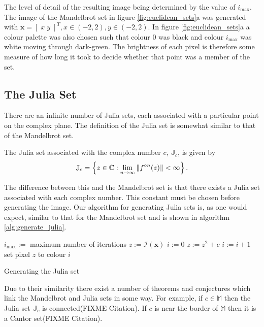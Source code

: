 The level of detail of the resulting image being determined by the value of $i_{\mbox{max}}$.
The image of the Mandelbrot set in figure \ref{fig:euclidean_sets}a was
generated with $\mathbf{x} = [\;x\;y\;]^T, x \in (-2,2), y \in (-2,2)$.
In figure \ref{fig:euclidean_sets}a a colour palette was also chosen such that colour 0 was black
and colour $i_{\mbox{max}}$ was white moving through dark-green. The brightness of
each pixel is therefore some measure of how long it took to decide whether that point was
a member of the set.

\subsection{The Julia Set}

There are an infinite number of Julia sets, each associated with
a particular point on the complex plane. The definition of the Julia set is somewhat
similar to that of the Mandelbrot set.

\begin{definition}
The Julia set associated
with the complex number $c$, $\mathbb{J}_c$, is given by
\[
\mathbb{J}_c = 
\left\{z \in \mathbb{C}
: \lim_{n \rightarrow \infty} \left\Vert f^{\circ n}(z) \right\Vert < \infty \right\}.
\]
\end{definition}

The difference between this and the Mandelbrot set is that there exists a 
Julia set associated with each complex number. This constant must be chosen before
generating the image. Our algorithm for generating Julia sets is, as one would
expect, similar to that for the Mandelbrot set and is shown in algorithm
\ref{alg:generate_julia}.

\begin{fancyalg}
\begin{algorithmic}[1]
\STATE $i_{\mbox{max}} :=$ maximum number of iterations
\STATE $z := {\mathcal I}(\mathbf{x})$
\STATE $i := 0$
  \STATE $z := z^2 + c$
  \STATE $i := i+1$
\ENDWHILE 
\STATE set pixel $z$ to colour $i$
\ENDFOR
\end{algorithmic}
\caption{
\label{alg:generate_julia}
  Generating the Julia set}
\end{fancyalg}

Due to their similarity there exist a number of theorems and conjectures which link the
Mandelbrot and Julia sets in some way. For example, if $c \in \mathbb{M}$ then
the Julia set $\mathbb{J}_c$ is connected(FIXME Citation). If $c$ is near the 
border of $\mathbb{M}$ then it is a Cantor set(FIXME Citation).

